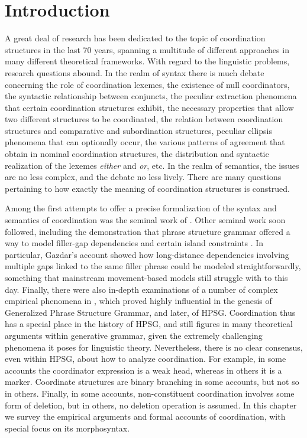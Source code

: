 {



\section{Introduction} 

A great deal of research has been dedicated to the topic of coordination structures in the last  70 years, spanning a multitude of different approaches in many different theoretical frameworks.  With regard to the linguistic problems, research questions abound. In the realm of syntax there is much debate concerning the role of coordination lexemes, the existence of null coordinators, the syntactic relationship between conjuncts, the peculiar extraction phenomena that certain coordination structures exhibit, the necessary properties that allow two different structures to be coordinated, the relation between coordination structures and comparative and subordination structures, peculiar ellipsis phenomena that can optionally occur, the various patterns of agreement that obtain in nominal coordination structures, the distribution and syntactic realization of the lexemes \emph{either} and \emph{or}, etc. In the realm of semantics, the issues are no less complex, and the debate no less lively. There are many questions pertaining to how exactly the meaning of coordination structures is construed. 

Among the first attempts to offer a precise formalization of the syntax and semantics of coordination was the seminal work of \citet{gazdarc}. Other seminal work soon followed, including the demonstration that phrase structure grammar offered a way to model filler-gap dependencies and certain island constraints \citep{gazdar}. In particular, Gazdar's account showed how long-distance dependencies involving multiple gaps linked to the same filler phrase could be modeled straightforwardly, something that mainstream movement-based models still struggle with to this day. Finally, there were also 
 in-depth examinations of a number of complex empirical phenomena in  \citet{gazd1982}, which  proved highly influential in the genesis of Generalized Phrase Structure Grammar, and later, of HPSG. Coordination thus has a special place in the history of HPSG, and still figures  in many theoretical arguments within generative grammar,  given the extremely challenging phenomena it poses for linguistic theory. 
Nevertheless, there is no clear consensus, even within HPSG, about how to analyze coordination. For example, in some accounts the coordinator
expression is a weak head, whereas in others it is a marker. Coordinate structures are binary branching in some accounts, but not so in others. Finally, in  some accounts, non-constituent coordination involves some form of deletion, but in others, no deletion operation is assumed.  
In this chapter we survey the empirical arguments and formal accounts of coordination, with special focus on its morphosyntax.

}
